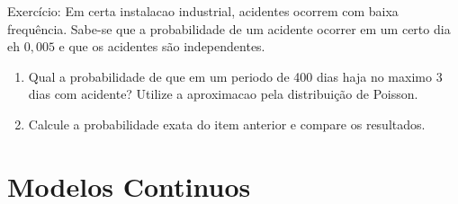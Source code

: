 \documentclass[11pt,a4paper]{book}
\begin{document}
\begin{description}
\begin{description}
\begin{description}
  \item{Exercício}: Em certa instalacao industrial, acidentes ocorrem com baixa frequência. Sabe-se que 
    a probabilidade de um acidente ocorrer em um certo dia eh $0,005$ e que os acidentes são independentes.
    
    \begin{enumerate}[label=(\alph*)]
      \item Qual a probabilidade de que em um periodo de 400 dias haja no maximo 3 dias com acidente?
      Utilize a aproximacao pela distribuição de Poisson.
    \item Calcule a probabilidade exata do item anterior e compare os resultados.
   \end{enumerate}
  \end{description}
\end{description}
   \end{description}
   \section{Modelos Continuos}
\end{document}

